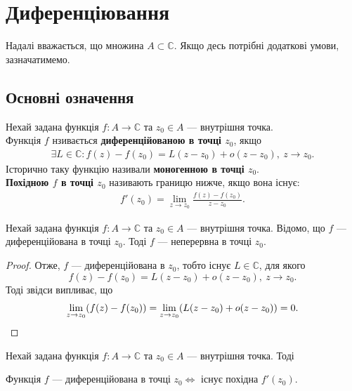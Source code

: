 \documentclass{math_library}
\begin{document}
\newpage
	
\section{Диференціювання}
Надалі вважається, що множина $A \subset \mathbb{C}$. Якщо десь потрібні додаткові умови, зазначатимемо.

\subsection{Основні означення}
\begin{definition}
Нехай задана функція $f \colon A \to \mathbb{C}$ та $z_0 \in A$ --- внутрішня точка.\\
Функція $f$ нзивається \textbf{диференційованою в точці $z_0$}, якщо
\begin{align*}
	\exists L \in \mathbb{C}: f(z)-f(z_0)=L(z-z_0) + o(z-z_0),\ z \to z_0.
\end{align*}
Історично таку функцію називали \textbf{моногенною в точці $z_0$}.\\
\textbf{Похідною $f$ в точці $z_0$} називають границю нижче, якщо вона існує:
\begin{align*}
	f'(z_0) = \lim_{z \to z_0} \frac{f(z)-f(z_0)}{z-z_0}.
\end{align*}
\end{definition}

\begin{proposition}
Нехай задана функція $f \colon A \to \mathbb{C}$ та $z_0 \in A$ --- внутрішня точка. Відомо, що $f$ --- диференційована в точці $z_0$. Тоді $f$ --- неперервна в точці $z_0$.
\end{proposition}

\begin{proof}
Отже, $f$ --- диференційована в $z_0$, тобто існує $L \in \mathbb{C}$, для якого 
\[
f(z) - f(z_0) = L(z-z_0) + o(z-z_0),\ z \to z_0.
\]
Тоді звідси випливає, що
\[
\lim_{z \to z_0} (f(z)-f(z_0)) = \lim_{z \to z_0} (L(z-z_0) + o(z-z_0)) = 0. \qedhere
\]
\end{proof}
	
\begin{proposition}
Нехай задана функція $f \colon A \to \mathbb{C}$ та $z_0 \in A$ --- внутрішня точка. Тоді
\begin{center}
Функція $f$ --- диференційована в точці $z_0 \iff$ існує похідна $f'(z_0)$.
\end{center}
\end{proposition}
\end{document}
